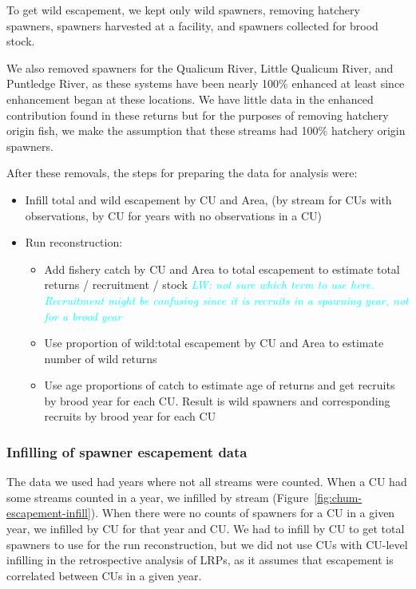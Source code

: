 \documentclass[11pt]{book}
\begin{document}
To get wild escapement, we kept only wild spawners, removing hatchery spawners, spawners harvested at a facility, and spawners collected for brood stock.

We also removed spawners for the Qualicum River, Little Qualicum River, and Puntledge River, as these systems have been nearly 100\% enhanced at least since enhancement began at these locations. We have little data in the enhanced contribution found in these returns but for the purposes of removing hatchery origin fish, we make the assumption that these streams had 100\% hatchery origin spawners.

After these removals, the steps for preparing the data for analysis were:
\begin{itemize}

\item
  Infill total and wild escapement by CU and Area, (by stream for CUs with observations, by CU for years with no observations in a CU)
\item
  Run reconstruction:
  \begin{itemize}

  \item
    Add fishery catch by CU and Area to total escapement to estimate total returns / recruitment / stock \emph{\textcolor{cyan}{LW: not sure which term to use here. Recruitment might be confusing since it is recruits in a spawning year, not for a brood year}}
  \item
    Use proportion of wild:total escapement by CU and Area to estimate number of wild returns
  \item
    Use age proportions of catch to estimate age of returns and get recruits by brood year for each CU. Result is wild spawners and corresponding recruits by brood year for each CU
  \end{itemize}
\end{itemize}
\hypertarget{infilling-of-spawner-escapement-data}{%
\subsubsection{Infilling of spawner escapement data}\label{infilling-of-spawner-escapement-data}}

The data we used had years where not all streams were counted. When a CU had some streams counted in a year, we infilled by stream (Figure~\ref{fig:chum-escapement-infill}). When there were no counts of spawners for a CU in a given year, we infilled by CU for that year and CU. We had to infill by CU to get total spawners to use for the run reconstruction, but we did not use CUs with CU-level infilling in the retrospective analysis of LRPs, as it assumes that escapement is correlated between CUs in a given year.
\end{document}
